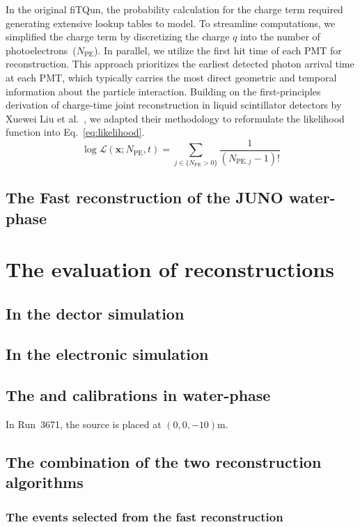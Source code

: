 In the original fiTQun, the probability calculation for the charge term required generating extensive lookup tables to model. To streamline computations, we simplified the charge term by discretizing the charge $q$ into the number of photoelectrons~($N_{\mathrm{PE}}$).
In parallel, we utilize the first hit time of each PMT for reconstruction. This approach prioritizes the earliest detected photon arrival time at each PMT, which typically carries the most direct geometric and temporal information about the particle interaction. Building on the first-principles derivation of charge-time joint reconstruction in liquid scintillator detectors by Xuewei Liu et al.~\cite{xuewei}, we adapted their methodology to reformulate the likelihood function into Eq.~\ref{eq:likelihood}.
\begin{equation}
    \label{eq:likelihood}
    \log \mathcal{L}(\boldsymbol{x};{N_{\mathrm{PE}}},{t}) = \sum_{j \in \{N_{\mathrm{PE}}>0\}}\frac{1}{(N_{\mathrm{PE},j}-1)!}  
\end{equation}

\subsection{The Fast reconstruction of the JUNO water-phase}
\section{The evaluation of reconstructions}
\subsection{In the dector simulation}
\subsection{In the electronic simulation}
\subsection{The  and  calibrations in water-phase}
In Run~3671, the  source is placed at $(0,0,-10)$\si{m}.

\subsection{The combination of the two reconstruction algorithms}
\subsubsection{The events selected from the fast reconstruction}
